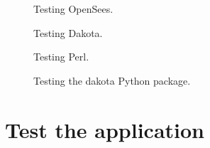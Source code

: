\begin{figure}[!htbp]
  \caption{Testing OpenSees.}
  \label{fig:opensees_test}
\end{figure}

\begin{figure}[!htbp]
  \caption{Testing Dakota.}
  \label{fig:dakota_test}
\end{figure}

\begin{figure}[!htbp]
  \caption{Testing Perl.}
  \label{fig:perl_test}
\end{figure}

\begin{figure}[!htbp]
  \caption{Testing the dakota Python package.}
  \label{fig:dakota_py_test}
\end{figure}

\clearpage
\section{Test the \texttt{\getsoftwarename{}} application}
\label{sec:test_local}

